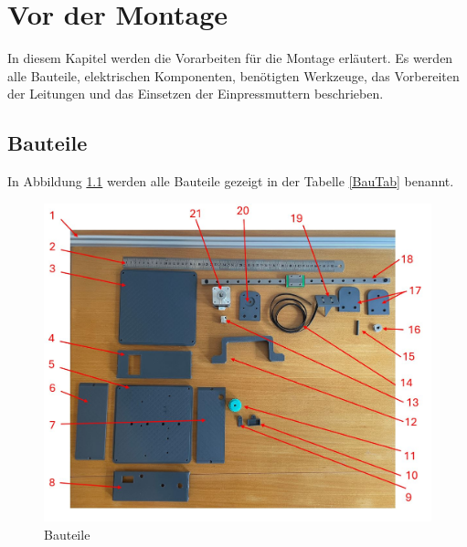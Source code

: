 %
\chapter{Vor der Montage}
In diesem Kapitel werden die Vorarbeiten für die Montage erläutert. Es werden alle Bauteile, elektrischen Komponenten, benötigten Werkzeuge, das Vorbereiten der Leitungen und das Einsetzen der Einpressmuttern beschrieben.

\section{Bauteile}
In Abbildung \ref{Bauteile} werden alle Bauteile gezeigt in der Tabelle \ref{BauTab} benannt.

\begin{figure}[H]
	\begin{center}
		\includegraphics[width=\textwidth]{Images/BauTeile.jpg}
		\caption{Bauteile} \label{Bauteile}
	\end{center}
\end{figure}

